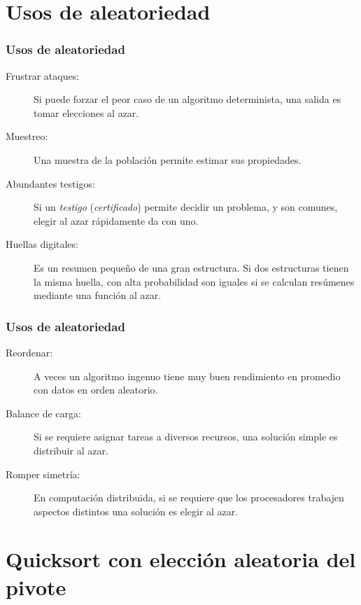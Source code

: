 \documentclass[english, spanish, fleqn,%
hyperref = {colorlinks, urlcolor = blue}%
]{beamer}
\begin{document}
\section{Usos de aleatoriedad}

\begin{frame}
  \setcounter{beamerpauses}{2}
  \frametitle{Usos de aleatoriedad}

  \begin{description}
  \item[Frustrar ataques:]
    Si puede forzar el peor caso de un algoritmo determinista,
    una salida es tomar elecciones al azar.
  \item[Muestreo:]
    Una muestra de la población permite estimar sus propiedades.
  \item[Abundantes testigos:]
    Si un \emph{testigo}
    (\emph{certificado})
    permite decidir un problema,
    y son comunes,
    elegir al azar rápidamente da con uno.
  \item[Huellas digitales:]
    Es un resumen pequeño de una gran estructura.
    Si dos estructuras tienen la misma huella,
    con alta probabilidad son iguales
    si se calculan resúmenes mediante una función al azar.
  \end{description}
\end{frame}

\begin{frame}
  \setcounter{beamerpauses}{2}
  \frametitle{Usos de aleatoriedad}

  \begin{description}
  \item[Reordenar:]
    A veces un algoritmo ingenuo tiene muy buen rendimiento en promedio
    con datos en orden aleatorio.
  \item[Balance de carga:]
    Si se requiere asignar tareas a diversos recursos,
    una solución simple es distribuir al azar.
  \item[Romper simetría:]
    En computación distribuida,
    si se requiere que los procesadores trabajen aspectos distintos
    una solución es elegir al azar.
  \end{description}
\end{frame}

\section{Quicksort con elección aleatoria del pivote}
\end{document}
